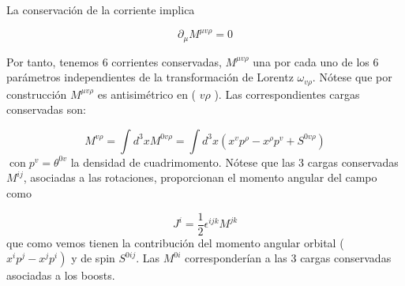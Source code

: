 La conservación de la corriente implica

\begin{equation*}
\partial_{\mu} M^{\mu v \rho}=0 \tag{3.75}
\end{equation*}

Por tanto, tenemos 6 corrientes conservadas, $M^{\mu v \rho}$ una por cada uno de los 6 parámetros independientes de la transformación de Lorentz $\omega_{v \rho}$. Nótese que por construcción $M^{\mu v \rho}$ es antisimétrico en ( $v \rho$ ). Las correspondientes cargas conservadas son:

\begin{equation*}
M^{v \rho}=\int d^{3} x M^{0 v \rho}=\int d^{3} x\left(x^{v} p^{\rho}-x^{\rho} p^{v}+S^{0 v \rho}\right) \tag{3.76}
\end{equation*}
$\operatorname{con} p^{v}=\theta^{0 v}$ la densidad de cuadrimomento.
Nótese que las 3 cargas conservadas $M^{i j}$, asociadas a las rotaciones, proporcionan el momento angular del campo como

\begin{equation*}
J^{i}=\frac{1}{2} \epsilon^{i j k} M^{j k} \tag{3.77}
\end{equation*}
que como vemos tienen la contribución del momento angular orbital ( $\left.x^{i} p^{j}-x^{j} p^{i}\right)$ y de spin $S^{0 i j}$. Las $M^{0 i}$ corresponderían a las 3 cargas conservadas asociadas a los boosts.